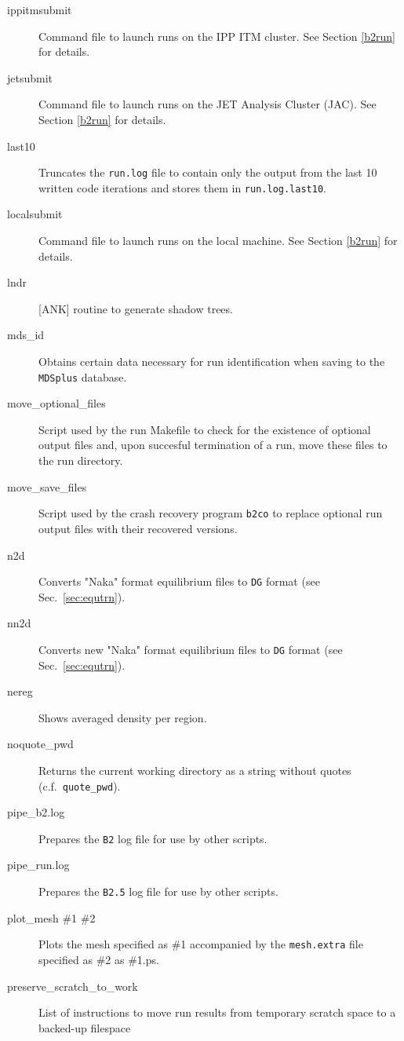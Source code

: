 \documentclass[a4paper,10pt]{report}
\begin{document}
\begin{itemize}
\begin{description}
  \item[ippitmsubmit] Command file to launch runs on the IPP ITM cluster. See Section \ref{b2run} for details.
  \item[jetsubmit] Command file to launch runs on the JET Analysis Cluster (JAC). See Section \ref{b2run} for details.
  \item[last10] Truncates the {\tt run.log} file to contain only the output from the last 10 written code iterations and stores them in {\tt run.log.last10}.
  \item[localsubmit] Command file to launch runs on the local machine. See Section \ref{b2run} for details.
  \item[lndr] [ANK] routine to generate shadow trees.
  \item[mds\_id] Obtains certain data necessary for run identification when saving to the {\tt MDSplus} database.
  \item[move\_optional\_files] Script used by the run Makefile to check for the existence of optional output files and, upon succesful termination of a run, move these files to the run directory.
  \item[move\_save\_files] Script used by the crash recovery program {\tt b2co} to replace optional run output files with their recovered versions.
  \item[n2d] Converts "Naka" format equilibrium files to {\tt DG} format (see Sec.~\ref{sec:equtrn}).
  \item[nn2d] Converts new "Naka" format equilibrium files to {\tt DG} format (see Sec.~\ref{sec:equtrn}).
  \item[nereg] Shows averaged density per region.
  \item[noquote\_pwd] Returns the current working directory as a string without quotes (c.f.\ {\tt quote\_pwd}).
  \item[pipe\_b2.log] Prepares the {\tt B2} log file for use by other scripts.
  \item[pipe\_run.log] Prepares the {\tt B2.5} log file for use by other scripts.
  \item[plot\_mesh \#1 \#2] Plots the mesh specified as \#1 accompanied by the {\tt mesh.extra} file specified as \#2 as \#1.ps.
  \item[preserve\_scratch\_to\_work] List of instructions to move run results from temporary scratch space to a backed-up filespace

\end{description}
\end{itemize}
\end{document}

